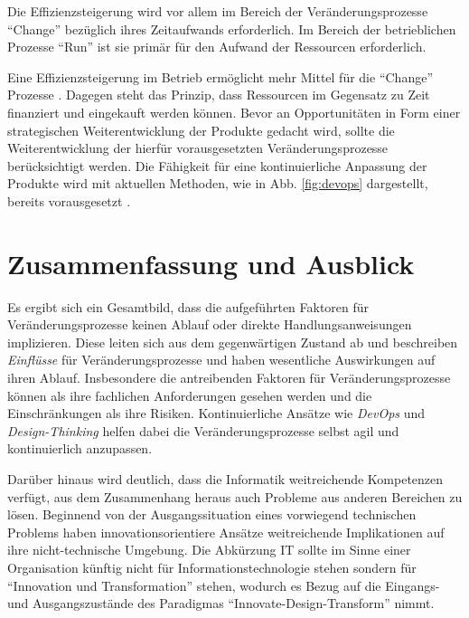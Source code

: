 \begin{enumerate}
    Die Effizienzsteigerung wird vor allem im Bereich der Veränderungsprozesse \enquote{Change} bezüglich ihres Zeitaufwands erforderlich. Im Bereich der betrieblichen Prozesse \enquote{Run} ist sie primär für den Aufwand der Ressourcen erforderlich.
    
    Eine Effizienzsteigerung im Betrieb ermöglicht mehr Mittel für die \enquote{Change} Prozesse \cite{Rausch2006}. Dagegen steht das Prinzip, dass Ressourcen im Gegensatz zu Zeit finanziert und eingekauft werden können. Bevor an Opportunitäten in Form einer strategischen Weiterentwicklung der Produkte \cite{Rausch2006} gedacht wird, sollte die Weiterentwicklung der hierfür vorausgesetzten Veränderungsprozesse berücksichtigt werden. Die Fähigkeit für eine kontinuierliche Anpassung \cite{Bussmann2006, Ganswindt2006} der Produkte wird mit aktuellen Methoden, wie in Abb. \ref{fig:devops} dargestellt, bereits vorausgesetzt \cite{Alt2017}.

\end{enumerate}

\section{Zusammenfassung und Ausblick}
Es ergibt sich ein Gesamtbild, dass die aufgeführten Faktoren für Veränderungsprozesse keinen Ablauf oder direkte Handlungsanweisungen implizieren. Diese leiten sich aus dem gegenwärtigen Zustand ab und beschreiben \emph{Einflüsse} für Veränderungsprozesse und haben wesentliche Auswirkungen auf ihren Ablauf. Insbesondere die antreibenden Faktoren für Veränderungsprozesse können als ihre fachlichen Anforderungen gesehen werden und die Einschränkungen als ihre Risiken. Kontinuierliche Ansätze wie \emph{DevOps} und \emph{Design-Thinking} helfen dabei die Veränderungsprozesse selbst agil und kontinuierlich anzupassen. 

Darüber hinaus wird deutlich, dass die Informatik weitreichende Kompetenzen verfügt, aus dem Zusammenhang heraus auch Probleme aus anderen Bereichen zu lösen. Beginnend von der Ausgangssituation eines vorwiegend technischen Problems haben innovationsorientiere Ansätze weitreichende Implikationen auf ihre nicht-technische Umgebung. Die Abkürzung IT sollte im Sinne einer Organisation künftig nicht für Informationstechnologie stehen sondern für \enquote{Innovation und Transformation} stehen, wodurch es Bezug auf die Eingangs- und Ausgangszustände des Paradigmas \enquote{Innovate-Design-Transform} nimmt.

